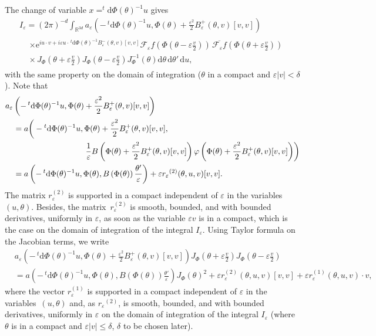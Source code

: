 \documentclass[AHL,Unicode,longabstracts]{cedram}
\newcommand*\R{{\mathbb R}}
\newcommand*\eps{\varepsilon}
\numberwithin{equation}{section}
\newcommand{\ee}{{\mathrm e}}
\newcommand*{\dd}{\mathrm{d}}
\newcommand*{\du}{\dd u}
\newcommand*{\dtheta}{\dd \theta}
\newcommand*{\dPhi}{\dd \Phi} %
\begin{document}
The change of variable $x=^t \dPhi (\theta)^{-1} u$ gives
\begin{multline*}
I_\eps = (2\pi)^{-d} \int_{\R^{3d}} a_\eps\left(-\,^t \dPhi (\theta)^{-1} u,\Phi(\theta)+\frac{\eps^2}{2} B_\eps^+(\theta,v)[v,v]\right)
\\
\begin{aligned}
&\times {\ee}^{i u\cdot v +i\eps u\cdot \,^t \dPhi (\theta)^{-1} B_\eps^-(\theta,v)[v,v]} {\mathcal F}_\eps f\left(\Phi\left(\theta -\eps\frac{v}{2}\right)\right)
\,\overline{{\mathcal F}_\eps f}\left(\Phi\left(\theta +\eps\frac{v}{2}\right)\right) \\
&\times \,J_\Phi \left(\theta +\eps\frac{v}{2}\right)J_\Phi\left(\theta -\eps\frac{v}{2}\right)J_\Phi^{-1} \left(\theta \right) \dtheta\,\dtheta'\,\du,
\end{aligned}
\end{multline*}
with the same property on the domain of integration ($\theta$ in a compact and $\eps |v|<\delta$). Note that
\begin{align*}
&a_\eps\left(-\,^t \dPhi (\theta)^{-1} u,\Phi(\theta)+\frac{\eps^2}{2} B_\eps^+(\theta,v)[v,v]\right)\\
&\quad=a\bigg(-{}^t \dPhi (\theta)^{-1} u,\Phi(\theta)+\frac{\eps^2}{2} B_\eps^+(\theta,v)[v,v],\\
&\mkern 180mu\frac{1}{\eps} B\left(\Phi(\theta)+\frac{\eps^2}{2} B_\eps^+(\theta,v)[v,v]\right) \varphi\left(\Phi(\theta)+\frac{\eps^2}{2} B_\eps^+(\theta,v)[v,v]\right)\biggr) \\
&\quad=a\left(-\,^t \dPhi (\theta)^{-1} u,\Phi(\theta), B\left(\Phi(\theta)\right) \frac{\theta'}{\eps}\right) +\eps r_\eps{^{(2)}} (\theta,u,v)[v,v].
\end{align*}
The matrix $r_\eps^{(2)}$ is supported in a compact independent of $\eps$ in the variables $(u,\theta)$. Besides, the matrix~$r_\eps^{(2)}$ is smooth, bounded, and with bounded derivatives, uniformly in $\eps$, as soon as the variable $\eps v$ is in a compact, which is the case on the domain of integration of the integral $I_\eps$. Using Taylor formula on the Jacobian terms, we write
\begin{align*}
&a_\eps\left(-\,^t \dPhi (\theta)^{-1} u,\Phi(\theta)+\frac{\eps^2}{2} B_\eps^+(\theta,v)[v,v]\right)J_\Phi \left(\theta +\eps \frac{v}{2}\right)J_\Phi\left(\theta -\eps \frac{v}{2}\right) \\
&= a\left(-\,^t \dPhi (\theta)^{-1} u,\Phi(\theta), B\left(\Phi(\theta)\right) \frac{\theta'}{\eps}\right) J_\Phi(\theta)^2+\eps r_\eps^{(2)} (\theta,u,v)[v,v]+ \eps r_\eps^{(1)} (\theta,u,v)\cdot v,
\end{align*}
where the vector $ r_\eps^{(1)}$ is supported in a compact independent of $\eps$ in the variables~$(u,\theta)$ and, as $r_\eps{^{(2)}}$, is smooth, bounded, and with bounded derivatives, uniformly in $\eps$ on the domain of integration of the integral $I_\eps$ (where $\theta$ is in a compact and $\eps |v|\leq \delta$, $\delta$ to be chosen later).
\end{document}
